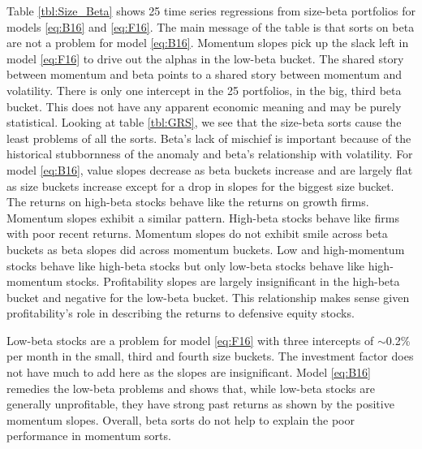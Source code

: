 
Table \ref{tbl:Size_Beta} shows 25 time series regressions from size-beta
portfolios for models \ref{eq:B16} and \ref{eq:F16}. The main message of the
table is that sorts on beta are not a problem for model \ref{eq:B16}. Momentum
slopes pick up the slack left in model \ref{eq:F16} to drive out the alphas in
the low-beta bucket. The shared story between momentum and beta points to a
shared story between momentum and volatility. There is only one intercept in
the 25 portfolios, in the big, third beta bucket. This does not have any
apparent economic meaning and may be purely statistical. Looking at table
\ref{tbl:GRS}, we see that the size-beta sorts cause the least problems of all
the sorts. Beta's lack of mischief is important because of the historical
stubbornness of the anomaly \parencite{jensen1972capital}
and beta's relationship with volatility.
For model \ref{eq:B16}, value slopes decrease as beta buckets increase and are
largely flat as size buckets increase except for a drop in slopes for the
biggest size bucket.
The returns on high-beta stocks behave like the returns on growth firms.
Momentum slopes exhibit a similar pattern.
High-beta stocks behave like firms with poor recent returns.
Momentum slopes do not exhibit smile across beta buckets as beta slopes did
across momentum buckets.
Low and high-momentum stocks behave like high-beta stocks but only low-beta
stocks behave like high-momentum stocks.
Profitability slopes are largely insignificant in the high-beta bucket and
negative for the low-beta bucket.
This relationship makes sense given profitability's role in describing the
returns to defensive equity stocks.

Low-beta stocks are a problem for model \ref{eq:F16} with three intercepts of
$\sim$0.2\% per month in the small, third and fourth size buckets.
The investment factor does not have much to add here as the slopes are
insignificant.
Model \ref{eq:B16} remedies the low-beta problems and shows that, while
low-beta stocks are generally unprofitable, they have strong past returns as
shown by the positive momentum slopes.
Overall, beta sorts do not help to explain the poor performance in momentum
sorts.
